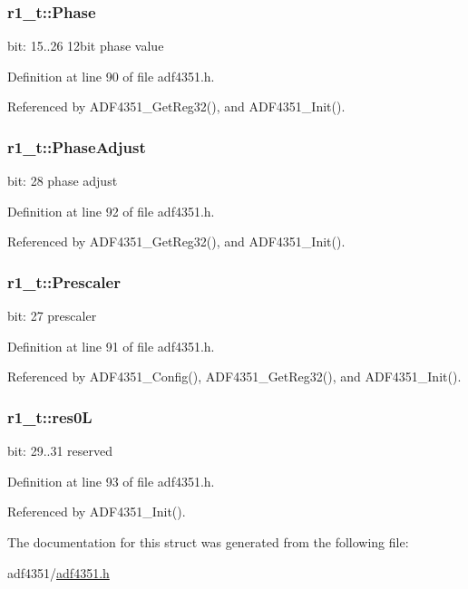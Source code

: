 \subsubsection[{\texorpdfstring{Phase}{Phase}}]{ r1\+\_\+t\+::\+Phase}\hypertarget{structr1__t_a08f87626a225a1256a9c45bb0d42af8a}{}\label{structr1__t_a08f87626a225a1256a9c45bb0d42af8a}
bit\+: 15..26 12bit phase value 

Definition at line 90 of file adf4351.\+h.



Referenced by A\+D\+F4351\+\_\+\+Get\+Reg32(), and A\+D\+F4351\+\_\+\+Init().

\subsubsection[{\texorpdfstring{Phase\+Adjust}{PhaseAdjust}}]{ r1\+\_\+t\+::\+Phase\+Adjust}\hypertarget{structr1__t_a339b676bde09218794b49904eb456a38}{}\label{structr1__t_a339b676bde09218794b49904eb456a38}
bit\+: 28 phase adjust 

Definition at line 92 of file adf4351.\+h.



Referenced by A\+D\+F4351\+\_\+\+Get\+Reg32(), and A\+D\+F4351\+\_\+\+Init().

\subsubsection[{\texorpdfstring{Prescaler}{Prescaler}}]{ r1\+\_\+t\+::\+Prescaler}\hypertarget{structr1__t_a9ee672a7fdd3a2d60591d43557feb390}{}\label{structr1__t_a9ee672a7fdd3a2d60591d43557feb390}
bit\+: 27 prescaler 

Definition at line 91 of file adf4351.\+h.



Referenced by A\+D\+F4351\+\_\+\+Config(), A\+D\+F4351\+\_\+\+Get\+Reg32(), and A\+D\+F4351\+\_\+\+Init().

\subsubsection[{\texorpdfstring{res0L}{res0L}}]{ r1\+\_\+t\+::res0L}\hypertarget{structr1__t_a0ce8c11e3227892e5d9afcde148d9300}{}\label{structr1__t_a0ce8c11e3227892e5d9afcde148d9300}
bit\+: 29..31 reserved 

Definition at line 93 of file adf4351.\+h.



Referenced by A\+D\+F4351\+\_\+\+Init().



The documentation for this struct was generated from the following file\+:\begin{DoxyCompactItemize}
\item 
adf4351/\hyperlink{adf4351_8h}{adf4351.\+h}\end{DoxyCompactItemize}

